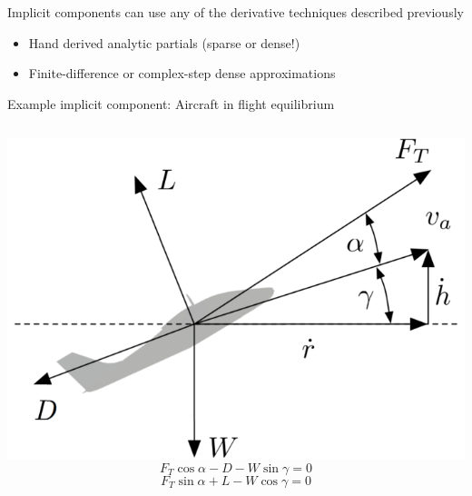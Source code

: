 \documentclass[aspectratio=169, usenames, dvipsnames, 14pt]{beamer}
\begin{document}
\begin{frame}{Implicit components can use any of the derivative techniques described previously}

	\begin{itemize}
		\item Hand derived analytic partials (sparse or dense!)
		\item Finite-difference or complex-step dense approximations
	\end{itemize}

\end{frame}     

\begin{frame}{Example implicit component: Aircraft in flight equilibrium}

	\begin{columns}
			\includegraphics[scale=.46]{images/slide_49_derivatives.png}
				$$ F_T \cos{\alpha} - D - W \sin{\gamma} = 0 $$
				$$ F_T \sin{\alpha} + L - W \cos{\gamma} = 0 $$
	\end{columns}

\end{frame}    
\end{document}
